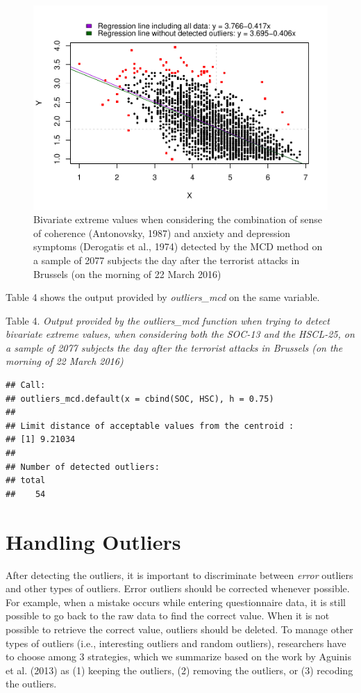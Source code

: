 \documentclass[man,floatsintext]{apa6}
\begin{document}
\begin{figure}
\centering
\includegraphics{Outliers_files/figure-latex/MCDSOC-1.pdf}
\caption{\label{fig:MCDSOC}Bivariate extreme values when considering the combination of sense of coherence (Antonovsky, 1987) and anxiety and depression symptoms (Derogatis et al., 1974) detected by the MCD method on a sample of 2077 subjects the day after the terrorist attacks in Brussels (on the morning of 22 March 2016)}
\end{figure}

Table 4 shows the output provided by \emph{outliers\_mcd} on the same variable.

Table 4.
\emph{Output provided by the outliers\_mcd function when trying to detect bivariate extreme values, when considering both the SOC-13 and the HSCL-25, on a sample of 2077 subjects the day after the terrorist attacks in Brussels (on the morning of 22 March 2016)}

\begin{verbatim}
## Call:
## outliers_mcd.default(x = cbind(SOC, HSC), h = 0.75)
## 
## Limit distance of acceptable values from the centroid :
## [1] 9.21034
## 
## Number of detected outliers:
## total 
##    54
\end{verbatim}

\hypertarget{handling-outliers}{%
\section{Handling Outliers}\label{handling-outliers}}

After detecting the outliers, it is important to discriminate between \emph{error} outliers and other types of outliers. Error outliers should be corrected whenever possible. For example, when a mistake occurs while entering questionnaire data, it is still possible to go back to the raw data to find the correct value. When it is not possible to retrieve the correct value, outliers should be deleted. To manage other types of outliers (i.e., interesting outliers and random outliers), researchers have to choose among 3 strategies, which we summarize based on the work by Aguinis et al. (2013) as (1) keeping the outliers, (2) removing the outliers, or (3) recoding the outliers.
\end{document}
